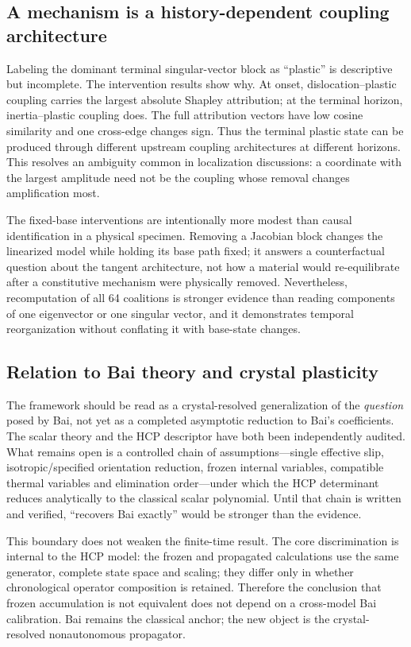 \subsection{A mechanism is a history-dependent coupling architecture}

Labeling the dominant terminal singular-vector block as ``plastic'' is descriptive but incomplete. The intervention results show why. At onset, dislocation--plastic coupling carries the largest absolute Shapley attribution; at the terminal horizon, inertia--plastic coupling does. The full attribution vectors have low cosine similarity and one cross-edge changes sign. Thus the terminal plastic state can be produced through different upstream coupling architectures at different horizons. This resolves an ambiguity common in localization discussions: a coordinate with the largest amplitude need not be the coupling whose removal changes amplification most.

The fixed-base interventions are intentionally more modest than causal identification in a physical specimen. Removing a Jacobian block changes the linearized model while holding its base path fixed; it answers a counterfactual question about the tangent architecture, not how a material would re-equilibrate after a constitutive mechanism were physically removed. Nevertheless, recomputation of all 64 coalitions is stronger evidence than reading components of one eigenvector or one singular vector, and it demonstrates temporal reorganization without conflating it with base-state changes.

\subsection{Relation to Bai theory and crystal plasticity}

The framework should be read as a crystal-resolved generalization of the \emph{question} posed by Bai, not yet as a completed asymptotic reduction to Bai's coefficients. The scalar theory and the HCP descriptor have both been independently audited. What remains open is a controlled chain of assumptions---single effective slip, isotropic/specified orientation reduction, frozen internal variables, compatible thermal variables and elimination order---under which the HCP determinant reduces analytically to the classical scalar polynomial. Until that chain is written and verified, ``recovers Bai exactly'' would be stronger than the evidence.

This boundary does not weaken the finite-time result. The core discrimination is internal to the HCP model: the frozen and propagated calculations use the same generator, complete state space and scaling; they differ only in whether chronological operator composition is retained. Therefore the conclusion that frozen accumulation is not equivalent does not depend on a cross-model Bai calibration. Bai remains the classical anchor; the new object is the crystal-resolved nonautonomous propagator.

